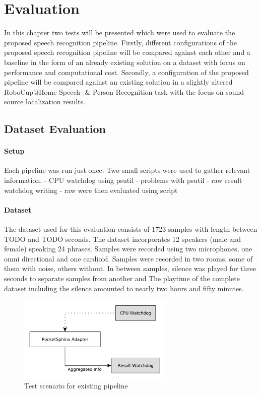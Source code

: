 

\chapter{Evaluation}

In this chapter two tests will be presented which were used to evaluate the proposed speech recognition pipeline. 
Firstly, different configurations of the proposed speech recognition pipeline will be compared against each other and a baseline in the form of an already existing solution on a dataset with focus on performance and computational cost.
Secondly, a configuration of the proposed pipeline will be compared against an existing solution in a slightly altered RoboCup@Home Speech- \& Person Recognition task with the focus on sound source localization results.



\section{Dataset Evaluation}

\subsubsection{Setup}
Each pipeline was run just once.
Two small scripts were used to gather relevant information.
- CPU watchdog using psutil
- problems with psutil
- raw result watchdog writing
- raw were then evaluated using script


\subsubsection{Dataset}
The dataset used for this evaluation consists of 1723 samples with length between TODO and TODO seconds.
The dataset incorporates 12 speakers (male and female) speaking 24 phrases. 
Samples were recorded using two microphones, one omni directional and one cardioid.
Samples were recorded in two rooms, some of them with noise, others without.
In between samples, silence was played for three seconds to separate samples from another and 
The playtime of the complete dataset including the silence amounted to nearly two hours and fifty minutes.



\begin{figure}[ht]
	\includegraphics[width=0.66\textwidth]{diagrams/eval_pipeline_1.pdf}
	\caption{Test scenario for existing pipeline}
	\label{pic:eval_p1_diag}
\end{figure}

